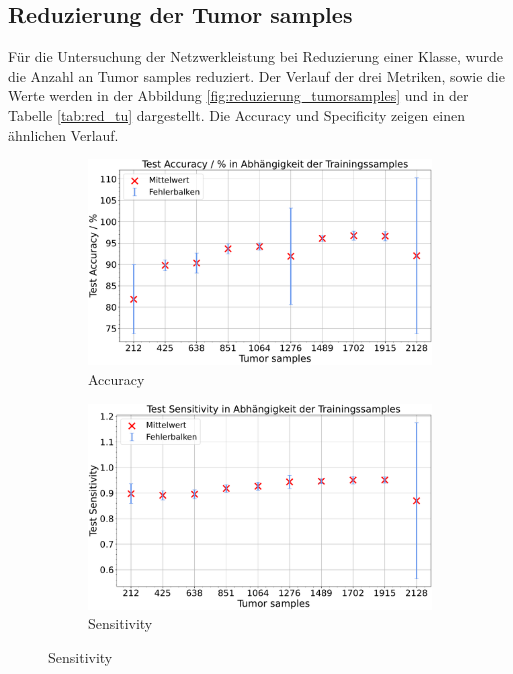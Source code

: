 \subsection{Reduzierung der Tumor samples}
Für die Untersuchung der Netzwerkleistung bei Reduzierung einer Klasse, wurde die Anzahl an Tumor samples reduziert.
Der Verlauf der drei Metriken, sowie die Werte werden in der Abbildung \ref{fig:reduzierung_tumorsamples} und in der Tabelle \ref{tab:red_tu} dargestellt.
Die Accuracy und Specificity zeigen einen ähnlichen Verlauf. 
\begin{figure}[H]
  \centering
  \begin{subfigure}[b]{0.48\textwidth}
    \includegraphics[width=\textwidth]{plots/neu Reduzierung-Tu + Balance_Accuracy_mean.pdf}
    \caption{Accuracy}
    \label{fig:reduzierung_tu_accuracy}
  \end{subfigure}
  \begin{subfigure}[b]{0.48\textwidth}
    \includegraphics[width=\textwidth]{plots/neu Reduzierung-Tu + Balance_Sensitivity_mean.pdf}
    \caption{Sensitivity}

\end{subfigure}
\end{figure}
